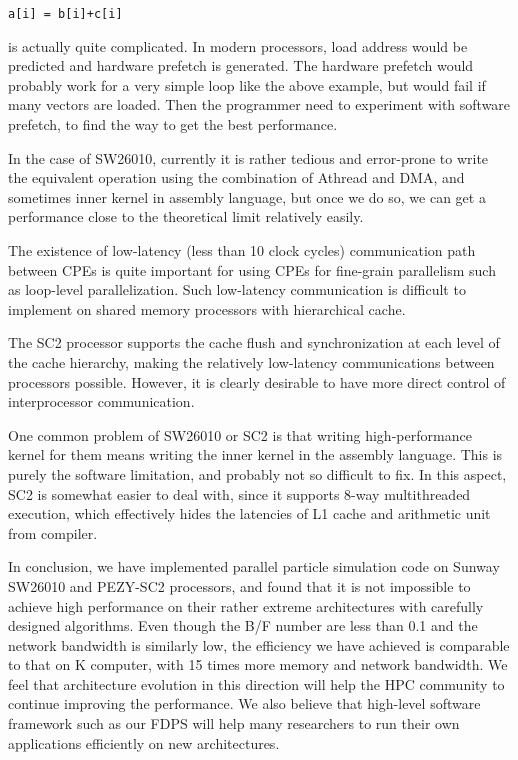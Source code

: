 \documentclass[conference]{IEEEtran}
\begin{document}
{\tt a[i] =   b[i]+c[i]}

is actually quite complicated. In modern processors, load address
would be predicted and hardware prefetch is generated. The hardware
prefetch would probably work for a very simple loop like the above
example, but would fail if many vectors are loaded. Then the
programmer need to experiment with software prefetch, to find the way
to get  the best performance. 

In the case of SW26010, currently it is rather tedious and error-prone
to write the equivalent operation using the combination of Athread and
DMA, and sometimes inner kernel in assembly language, but once we do
so, we can get a performance close to the theoretical limit
relatively easily.

The existence of low-latency (less than 10 clock cycles) communication
path between CPEs is quite important for using CPEs for fine-grain
parallelism such as loop-level parallelization. Such low-latency
communication is difficult to implement on shared memory processors
with hierarchical cache.

The SC2 processor supports the cache flush and
synchronization at each level of the cache hierarchy, making the
relatively low-latency communications between processors possible.
However, it is clearly desirable to have  more direct control of
interprocessor communication.

One common  problem of SW26010 or SC2 is that writing
high-performance kernel for them  means writing the inner
kernel in the assembly language. This is purely the software limitation,
and probably not so difficult to fix. In this aspect, SC2 is somewhat
easier to deal with, since it supports 8-way multithreaded execution,
which effectively hides the latencies of L1 cache and arithmetic unit
from compiler. 


In conclusion, we have implemented parallel particle simulation code
on Sunway SW26010 and PEZY-SC2 processors, and found that it is not
impossible to achieve high performance on their rather extreme
architectures with carefully designed algorithms. Even though the B/F
number are less than 0.1  and the network bandwidth is similarly low, the efficiency we
have achieved is comparable to that on K computer, with 15
times more memory and network bandwidth. We feel that architecture
evolution in this direction will help the HPC community to continue
improving the performance. We also believe that high-level software
framework such as our FDPS will help many researchers to run their own
applications efficiently on new architectures.
\end{document}
